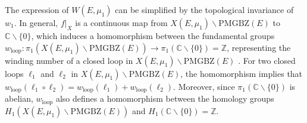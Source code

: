 \documentclass[pdflatex,sn-nature, iicol]{sn-jnl}%
\theoremstyle{thmstyleone}%
\theoremstyle{thmstyletwo}%
\theoremstyle{thmstylethree}%
\begin{document}
The expression of $W(E,\mu_1)$ can be simplified by the topological invariance
of $w_{1}$. In general, $f|_{X}$ is a continuous map from $X(E,\mu_{1})\backslash\text{PMGBZ}(E)$
to $\mathbb{C}\backslash\{0\}$, which induces a homomorphism between
the fundamental groups $w_{\text{loop}}:\pi_{1}\left(X(E,\mu_{1})\backslash\text{PMGBZ}(E)\right)\rightarrow\pi_{1}\left(\mathbb{C}\backslash\{0\}\right)=\mathbb{Z}$,
representing the winding number of a closed loop in $X(E,\mu_{1})\backslash\text{PMGBZ}(E)$
\cite{hatcherAlgebraicTopology2001}. For two closed loops $\ell_{1}$
and $\ell_{2}$ in $X(E,\mu_{1})\backslash\text{PMGBZ}(E)$, the homomorphism
implies that $w_{\text{loop}}\left(\ell_{1}\circ\ell_{2}\right)=w_{\text{loop}}\left(\ell_{1}\right)+w_{\text{loop}}\left(\ell_{2}\right)$.
Moreover, since $\pi_{1}\left(\mathbb{C}\backslash\{0\}\right)$ is
abelian, $w_{\text{loop}}$ also defines a homomorphism between the
homology groups $H_{1}\left(X(E,\mu_{1})\backslash\text{PMGBZ}(E)\right)$
and $H_{1}\left(\mathbb{C}\backslash\{0\}\right)=\mathbb{Z}$.
\end{document}
